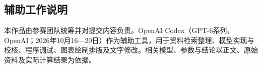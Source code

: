 \subsection*{辅助工作说明}
本作品由参赛团队统筹并对提交内容负责。OpenAI Codex（GPT-6系列，OpenAI；2026年10月16—20日）作为辅助工具，用于资料检索整理、模型实现与校核、程序调试、图表绘制排版及文字修改\cite{ai_tool}。相关模型、参数与结论以正文、原始资料及实际计算结果为依据。
\label{body-end}\clearpage
